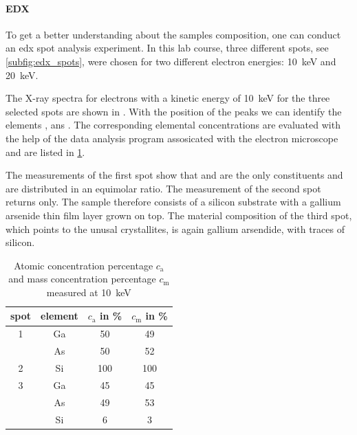 \paragraph{EDX}
To get a better understanding about the samples composition, one can
conduct an edx spot analysis experiment.
In this lab course, three different spots, see \cref{subfig:edx_spots},
were chosen for two different electron energies:
\qty{10}{\kilo \electronvolt}
and \qty{20}{\kilo\electronvolt}.

The X-ray spectra for electrons with a kinetic energy of
\qty{10}{\kilo\electronvolt} for the three selected spots are shown
in .
With the position of the peaks we can identify the elements
,  ans .
The corresponding elemental concentrations are evaluated with the help
of the data analysis program assosicated with the electron microscope and
are listed in \cref{tab:edx_1}.

The measurements of the first spot show that  and  are
the only constituents and are distributed in an equimolar ratio.
The measurement of the second spot returns  only.
The sample therefore consists of a silicon substrate with a
gallium arsenide thin film layer grown on top.
The material composition of the third spot, which points to
the unusal crystallites, is again gallium arsendide, with traces of
silicon.

\begin{table}
	\centering
	\begin{tabular}{cccc}
		\toprule
		spot & element & $c_\mathrm{a}$ in \unit{\percent } & $c_\mathrm{m}$ in \unit{\percent} \\
		\midrule
		1    & Ga      & 50                                 & 49                                \\
		     & As      & 50                                 & 52                                \\
		\midrule
		2    & Si      & 100                                & 100                               \\
		\midrule
		3    & Ga      & 45                                 & 45                                \\
		     & As      & 49                                 & 53                                \\
		     & Si      & 6                                  & 3                                 \\
		\bottomrule
	\end{tabular}
	\caption{Atomic concentration percentage $c_\mathrm{a}$ and mass
		concentration percentage $c_\mathrm{m}$ measured at \qty{10}{\kilo\electronvolt}}
	\label{tab:edx_1}
\end{table}

